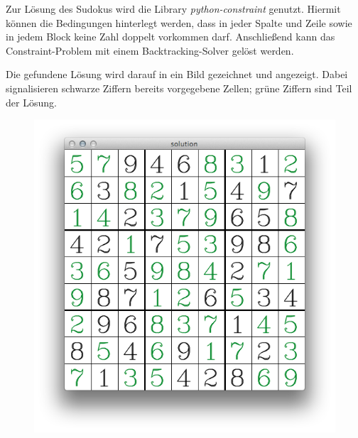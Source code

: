 Zur Lösung des Sudokus wird die Library \emph{python-constraint} genutzt. Hiermit können die Bedingungen hinterlegt werden, dass in jeder Spalte und Zeile sowie in jedem Block keine Zahl doppelt vorkommen darf.
Anschließend kann das Constraint-Problem mit einem Backtracking-Solver gelöst werden.

Die gefundene Lösung wird darauf in ein Bild gezeichnet und angezeigt.
Dabei signalisieren schwarze Ziffern bereits vorgegebene Zellen; grüne Ziffern sind Teil der Lösung.

\begin{figure}[H]
    \begin{center}
        \includegraphics[width=.5\textwidth]{Abbildungen/solution}
    \end{center}
\end{figure}
